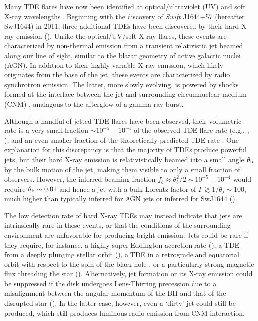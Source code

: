 \documentclass[usenatbib,fleqn]{mnras}
\begin{document}
Many TDE flares have now been identified at optical/ultraviolet (UV)
\citep{Gezari+2008, Gezari+2009, van-Velzen+2011, Gezari+2012,
  Arcavi+2014, Chornock+2014, Holoien+2014, Vinko+2015, Holoien+2016}
and soft X-ray wavelengths \citep{Bade+1996, Grupe+1999,
  Komossa&Greiner1999, Greiner+2000, Esquej+2007, Maksym+2010,
  Saxton+2012}. Beginning with the discovery of {\it Swift} J1644+57
(hereafter SwJ1644) in 2011, three additional TDEs have been
discovered by their hard X-ray emission (\citealt{Bloom+2011,
  Levan+2011, Burrows+2011, Zauderer+2011, Cenko+2012, Pasham+2015,
  Brown+2015}).  Unlike the optical/UV/soft X-ray flares, these events
are characterized by non-thermal emission from a transient
relativistic jet beamed along our line of sight, similar to the blazar
geometry of active galactic nuclei (AGN).  In addition to their highly
variable X-ray emission, which likely originates from the base of the
jet, these events are characterized by radio synchrotron emission.
The latter, more slowly evolving, is powered by shocks formed at the
interface between the jet and surrounding circumnuclear medium (CNM)
\citep{Bloom+2011,Giannios&Metzger2011,Metzger+2012,De-Colle+2012,Mimica+2015},
analagous to the afterglow of a gamma-ray burst.

Although a handful of jetted TDE flares have been observed, their
volumetric rate is a very small fraction $\sim 10^{-5}-10^{-4}$ of the
observed TDE flare rate (e.g., \citealt{Burrows+2011},
\citealt{Brown+2015}), and an even smaller fraction of the
theoretically predicted TDE rate
\citep{Wang&Merritt2004,Stone&Metzger2016}.  One explanation for this
discrepancy is that the majority of TDEs produce powerful jets, but
their hard X-ray emission is relativistically beamed into a small
angle $\theta_{\rm b}$ by the bulk motion of the jet, making them
visible to only a small fraction of observers.  However, the inferred
beaming fraction $f_b \approx \theta_{b}^{2}/2 \sim 10^{-5}-10^{-4}$
would require $\theta_{\rm b} \sim 0.01$ and hence a jet with a bulk
Lorentz factor of $\Gamma \gtrsim 1/\theta_j \sim 100$, much higher
than typically inferred for AGN jets or inferred for SwJ1644
(\citealt{Metzger+2012}).

The low detection rate of hard X-ray TDEs may instead indicate that
jets are intrinsically rare in these events, or that the conditions of
the surrounding environment are unfavorable for producing bright
emission.  Jets could be rare if they require, for instance, a highly
super-Eddington accretion rate (\citealt{De-Colle+2012}), a TDE from a
deeply plunging stellar orbit (\citealt{Metzger&Stone2015}), a TDE in
a retrograde and equatorial orbit with respect to the spin of the
black hole \citep{Parfrey+2015}, or a particularly strong magnetic
flux threading the star (\citealt{Tchekhovskoy+2014,Kelley+2014}).
Alternatively, jet formation or its X-ray emission could be suppressed
if the disk undergoes Lens-Thirring precession due to a misalignment
between the angular momentum of the BH and that of the disrupted star
(\citealt{Stone&Loeb2012}).  In the latter case, however, even a
`dirty' jet could still be produced, which still produces luminous
radio emission from CNM interaction.
\end{document}
